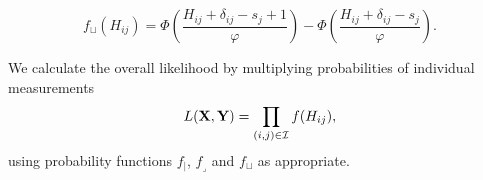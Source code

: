 \documentclass[11pt,oneside,letterpaper]{article}
\newcommand{\viruses}{\mathbf{X}}					%
\newcommand{\sera}{\mathbf{Y}}						%
\newcommand{\se}{s}									%
\newcommand{\point}{f_{\scriptscriptstyle \vert}}	%
\newcommand{\threshold}{f_{\textstyle \lrcorner}}	%
\newcommand{\interval}{f_{\sqcup}}					%
\newcommand{\mdssd}{\varphi}						%
\begin{document}
\begin{equation} 
	\interval(H_{ij}) = \Phi \left( \frac{ H_{ij} + \delta_{ij} - \se_j + 1 }{ \mdssd } \right) - \Phi \left( \frac{ H_{ij} + \delta_{ij} - \se_j }{\mdssd} \right).
\end{equation}


We calculate the overall likelihood by multiplying probabilities of individual measurements
\begin{equation}  \label{bmds}
	L(\viruses,\sera) = \prod_{(i,j) \in \cal I} f(H_{ij}),
\end{equation}
using probability functions $\point$, $\threshold$ and $\interval$ as appropriate.



\end{document}
